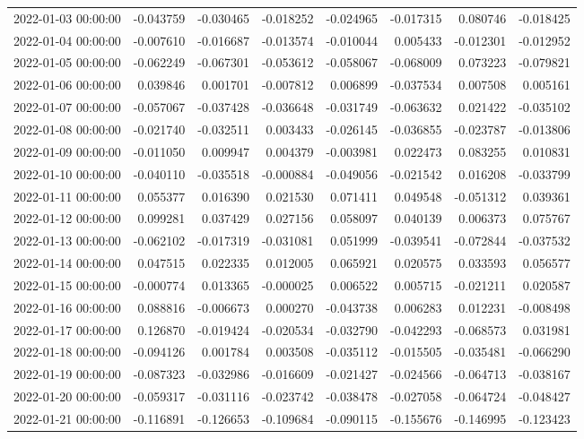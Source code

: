 \begin{tabular}{lrrrrrrr}
2022-01-03 00:00:00 & -0.043759 & -0.030465 & -0.018252 & -0.024965 & -0.017315 & 0.080746 & -0.018425 \\
2022-01-04 00:00:00 & -0.007610 & -0.016687 & -0.013574 & -0.010044 & 0.005433 & -0.012301 & -0.012952 \\
2022-01-05 00:00:00 & -0.062249 & -0.067301 & -0.053612 & -0.058067 & -0.068009 & 0.073223 & -0.079821 \\
2022-01-06 00:00:00 & 0.039846 & 0.001701 & -0.007812 & 0.006899 & -0.037534 & 0.007508 & 0.005161 \\
2022-01-07 00:00:00 & -0.057067 & -0.037428 & -0.036648 & -0.031749 & -0.063632 & 0.021422 & -0.035102 \\
2022-01-08 00:00:00 & -0.021740 & -0.032511 & 0.003433 & -0.026145 & -0.036855 & -0.023787 & -0.013806 \\
2022-01-09 00:00:00 & -0.011050 & 0.009947 & 0.004379 & -0.003981 & 0.022473 & 0.083255 & 0.010831 \\
2022-01-10 00:00:00 & -0.040110 & -0.035518 & -0.000884 & -0.049056 & -0.021542 & 0.016208 & -0.033799 \\
2022-01-11 00:00:00 & 0.055377 & 0.016390 & 0.021530 & 0.071411 & 0.049548 & -0.051312 & 0.039361 \\
2022-01-12 00:00:00 & 0.099281 & 0.037429 & 0.027156 & 0.058097 & 0.040139 & 0.006373 & 0.075767 \\
2022-01-13 00:00:00 & -0.062102 & -0.017319 & -0.031081 & 0.051999 & -0.039541 & -0.072844 & -0.037532 \\
2022-01-14 00:00:00 & 0.047515 & 0.022335 & 0.012005 & 0.065921 & 0.020575 & 0.033593 & 0.056577 \\
2022-01-15 00:00:00 & -0.000774 & 0.013365 & -0.000025 & 0.006522 & 0.005715 & -0.021211 & 0.020587 \\
2022-01-16 00:00:00 & 0.088816 & -0.006673 & 0.000270 & -0.043738 & 0.006283 & 0.012231 & -0.008498 \\
2022-01-17 00:00:00 & 0.126870 & -0.019424 & -0.020534 & -0.032790 & -0.042293 & -0.068573 & 0.031981 \\
2022-01-18 00:00:00 & -0.094126 & 0.001784 & 0.003508 & -0.035112 & -0.015505 & -0.035481 & -0.066290 \\
2022-01-19 00:00:00 & -0.087323 & -0.032986 & -0.016609 & -0.021427 & -0.024566 & -0.064713 & -0.038167 \\
2022-01-20 00:00:00 & -0.059317 & -0.031116 & -0.023742 & -0.038478 & -0.027058 & -0.064724 & -0.048427 \\
2022-01-21 00:00:00 & -0.116891 & -0.126653 & -0.109684 & -0.090115 & -0.155676 & -0.146995 & -0.123423 \\

\end{tabular}
